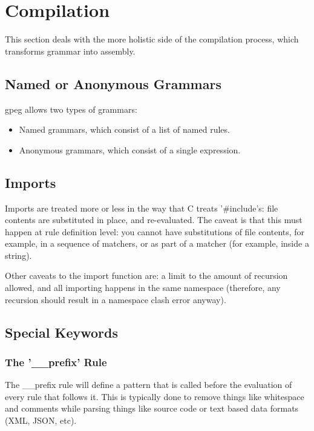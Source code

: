 \section{Compilation}

This section deals with the more holistic side of the compilation process,
which transforms grammar into assembly.

\subsection{Named or Anonymous Grammars}

gpeg allows two types of grammars:

\begin{itemize}
\item Named grammars, which consist of a list of named rules.
\item Anonymous grammars, which consist of a single expression.
\end{itemize}

\subsection{Imports}

Imports are treated more or less in the way that C treats '\#include's:
file contents are substituted in place, and re-evaluated. The caveat
is that this must happen at rule definition level: you cannot have
substitutions of file contents, for example, in a sequence of matchers,
or as part of a matcher (for example, inside a string).

Other caveats to the import function are: a limit to the amount of
recursion allowed, and all importing happens in the same namespace
(therefore, any recursion should result in a namespace clash error
anyway).

\subsection{Special Keywords}

\subsubsection{The '\_\_prefix' Rule}

The \_\_prefix rule will define a pattern that is called before
the evaluation of every rule that follows it. This is typically
done to remove things like whitespace and comments while parsing
things like source code or text based data formats (XML, JSON, etc).

